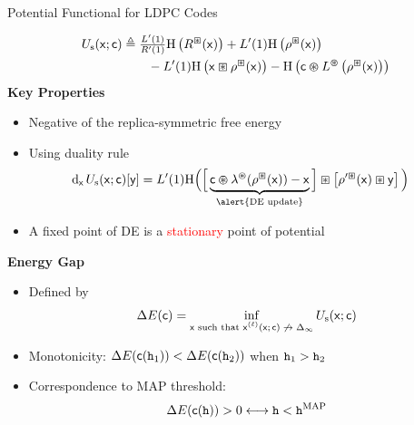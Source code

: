 \documentclass{beamer}
\newlength{\twocolwid}
\begin{document}
\begin{frame}
\begin{columns}[t]
  \begin{column}{\twocolwid}
    \vspace{0.75cm}
    \begin{block}{Potential Functional for LDPC Codes}
      \vspace{0.75cm}
      \setlength\tikzheight{14.5cm}
      \setlength\tikzwidth{19cm} 
      
      \begin{align*}
        U_\mathrm{s}(\mathsf{x}; \mathsf{c}) &\triangleq  \tfrac{L'(1)}{R'(1)} \mathrm{H} \left( R^{\boxast}(\mathsf{x}) \right) + L'(1) \mathrm{H} \left(  \rho^{\boxast}(\mathsf{x})  \right) \\
        & \qquad - L'(1) \mathrm{H} \left( \mathsf{x} \boxast \rho^{\boxast}(\mathsf{x}) \right) - \mathrm{H} \left(  \mathsf{c} \varoast L^{\varoast} \left( \rho^{\boxast}(\mathsf{x}) \right)  \right) 
      \end{align*}
      \vspace{1cm}
      \textcolor{jblue}{\bf Key Properties}
      \begin{itemize}
      \item Negative of the replica-symmetric free energy
      \item\vspace{0.75cm} Using duality rule
        \vspace{0.75cm}
        \begin{align*}
          \deri{\msx} \pots( \msx ; \msc ) [\msy] &= L'(1) \mathrm{H} \Big{(} \Big{[} \underbrace{\msc \vnop \lambda^{\vnop}(\rho^{\cnop}(\msx)) - \msx}_{\alert{\text{DE update}}} \Big{]} \cnop \left[ \rho'^{\cnop}(\msx) \cnop \msy \right] \Big{)}
        \end{align*}
      \item\vspace{0.75cm} A fixed point of DE is a \textcolor{red}{stationary} point of potential

      \end{itemize}
      \vspace{1cm}
      \textcolor{jblue}{\bf Energy Gap}
      \begin{itemize}
      \item\vspace{0.75cm} Defined by
        \begin{align*}
          \Delta E(\mathsf{c}) = \inf_{\text{$\mathsf{x}$ such that $\mathsf{x}^{(\ell)}(\mathsf{x} ; \mathsf{c}) \not \to \Delta_\infty$}} U_\mathrm{s}(\mathsf{x} ; \mathsf{c})
        \end{align*}
      \item\vspace{0.75cm} Monotonicity: $\Delta E(\mathsf{c}(\texttt{h}_1)) < \Delta E(\mathsf{c}(\texttt{h}_2)) $ when $\texttt{h}_1 > \texttt{h}_2$
      \item\vspace{0.75cm} Correspondence to MAP threshold:
        \begin{align*}
          \Delta E(\mathsf{c}(\texttt{h})) > 0  \longleftrightarrow  \texttt{h} < \texttt{h}^{\mathrm{MAP}}
        \end{align*}
      \end{itemize}
    \end{block}


\end{column}
\end{columns}
\end{frame}
\end{document}
